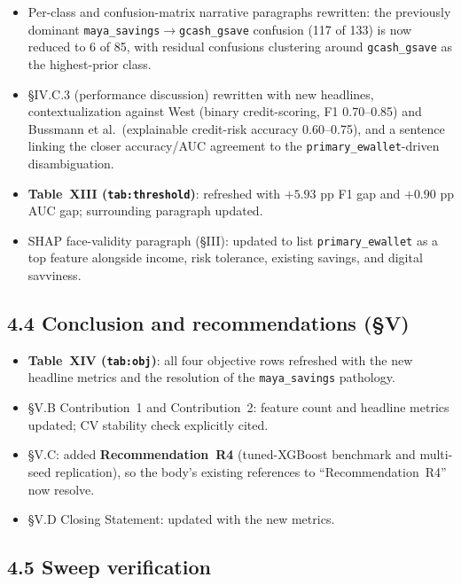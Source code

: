 \documentclass[11pt,a4paper]{article}
\begin{document}
\begin{itemize}
    the new EBM and XGBoost classification reports.
    \item Per-class and confusion-matrix narrative paragraphs
    rewritten: the previously dominant
    \texttt{maya\_savings}$\to$\texttt{gcash\_gsave} confusion (117 of
    133) is now reduced to 6 of 85, with residual confusions clustering
    around \texttt{gcash\_gsave} as the highest-prior class.
    \item \S IV.C.3 (performance discussion) rewritten with new
    headlines, contextualization against West (binary credit-scoring,
    F1 0.70--0.85) and Bussmann et al.\ (explainable credit-risk
    accuracy 0.60--0.75), and a sentence linking the closer
    accuracy/AUC agreement to the
    \texttt{primary\_ewallet}-driven disambiguation.
    \item \textbf{Table~XIII (\texttt{tab:threshold})}: refreshed with
    $+5.93$ pp F1 gap and $+0.90$ pp AUC gap; surrounding paragraph
    updated.
    \item SHAP face-validity paragraph (\S III): updated to list
    \texttt{primary\_ewallet} as a top feature alongside income, risk
    tolerance, existing savings, and digital savviness.
\end{itemize}

\subsection*{4.4 Conclusion and recommendations (\S V)}

\begin{itemize}
    \item \textbf{Table~XIV (\texttt{tab:obj})}: all four objective
    rows refreshed with the new headline metrics and the resolution of
    the \texttt{maya\_savings} pathology.
    \item \S V.B Contribution~1 and Contribution~2: feature count and
    headline metrics updated; CV stability check explicitly cited.
    \item \S V.C: added \textbf{Recommendation~R4} (tuned-XGBoost
    benchmark and multi-seed replication), so the body's existing
    references to ``Recommendation~R4'' now resolve.
    \item \S V.D Closing Statement: updated with the new metrics.
\end{itemize}

\subsection*{4.5 Sweep verification}
\end{document}
